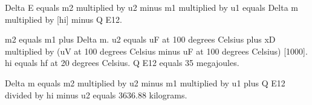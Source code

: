 Delta E equals m2 multiplied by u2 minus m1 multiplied by u1 equals Delta m multiplied by [hi] minus Q E12.  

m2 equals m1 plus Delta m.  
u2 equals uF at 100 degrees Celsius plus xD multiplied by (uV at 100 degrees Celsius minus uF at 100 degrees Celsius) [1000].  
hi equals hf at 20 degrees Celsius.  
Q E12 equals 35 megajoules.  

Delta m equals m2 multiplied by u2 minus m1 multiplied by u1 plus Q E12 divided by hi minus u2 equals 3636.88 kilograms.